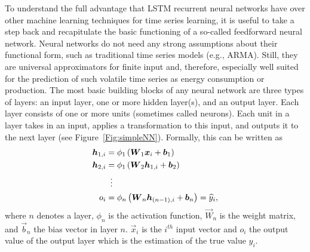 To understand the full advantage that LSTM recurrent neural networks have over other machine learning techniques for time series learning, it is useful to take a step back and recapitulate the basic functioning of a so-called feedforward neural network. Neural networks do not need any strong assumptions about their functional form, such as traditional time series models (e.g., ARMA). Still, they are universal approximators for finite input \citep{Hornik:1989} and, therefore, especially well suited for the prediction of such volatile time series as energy consumption or production. The most basic building blocks of any neural network are three types of layers: an input layer, one or more hidden layer(s), and an output layer. Each layer consists of one or more units (sometimes called neurons). Each unit in a layer takes in an input, applies a transformation to this input, and outputs it to the next layer (see Figure~\ref{Fig:simpleNN}). Formally, this can be written as
%
\begin{equation} \label{Eq:feedforward}
\begin{split}
    \vec{h}_{1,i}&=\phi_1\left(\vec{W}_1\vec{x}_i+\vec{b}_1\right)\\
    \vec{h}_{2,i}&=\phi_1\left(\vec{W}_2\vec{h}_{1,i}+\vec{b}_2\right)\\
    &\setbox0\hbox{=}\mathrel{\makebox[\wd0]{\hfil\vdots\hfil}}\\
    o_i&=\phi_n\left(\vec{W}_n\vec{h}_{(n-1),i}+\vec{b}_n\right)=\widehat{y}_i,
\end{split}
\end{equation}
%
where $n$ denotes a layer, $\phi_n$ is the activation function, $\vec{W}_n$ is the weight matrix, and $\vec{b}_n$ the bias vector in layer $n$. $\vec{x}_i$ is the $i^{th}$ input vector and $o_i$ the output value of the output layer which is the estimation of the true value $y_i$.
%
